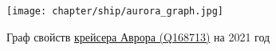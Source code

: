 \newpage
\begin{figure}[h]
  \texttt{[image: chapter/ship/aurora\_graph.jpg]}
  \caption[Граф свойств Авроры, 2021 год.]{Граф свойств \href{https://www.wikidata.org/wiki/Q168713}{крейсера Аврора (Q168713)} на 2021 год}%
  \label{fig:aurora_graph}%
\end{figure}






